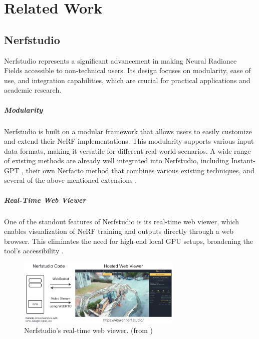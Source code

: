 %
\chapter{Related Work}
\label{sec:related}

\section{Nerfstudio}
\label{sec:related:nerfstudio}

Nerfstudio \cite{tancik_nerfstudio_2023} represents a significant advancement in making Neural Radiance Fields accessible to non-technical users.
Its design focuses on modularity, ease of use, and integration capabilities, which are crucial for practical applications and academic research.

\paragraph{Modularity}
Nerfstudio is built on a modular framework that allows users to easily customize and extend their NeRF implementations.
This modularity supports various input data formats, making it versatile for different real-world scenarios.
A wide range of existing methods are already well integrated into Nerfstudio, including Instant-GPT \cite{muller_instant_2022}, their own Nerfacto \cite{noauthor_nerfacto_nodate} method that combines various existing techniques, and several of the above mentioned extensions \cite{haque_instruct-nerf2nerf_2023,jan-niklas_dihlmann_signerf_2024}.

\paragraph{Real-Time Web Viewer}
One of the standout features of Nerfstudio is its real-time web viewer, which enables visualization of NeRF training and outputs directly through a web browser.
This eliminates the need for high-end local GPU setups, broadening the tool's accessibility \cite{noauthor_nerfstudio-projectviser_2024}.

\begin{figure}[h!]
  \centering
  \includegraphics[width=0.7\textwidth]{figures/related-nerfstudio-viewer.png}
  \caption{Nerfstudio's real-time web viewer. (from \cite{tancik_nerfstudio_2023})}
  \label{fig:nerfstudio-viewer}
\end{figure}

